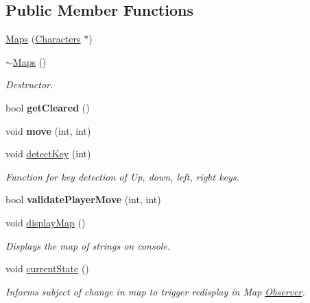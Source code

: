 \subsection*{Public Member Functions}
\begin{DoxyCompactItemize}
\item 
\hyperlink{class_maps_a7396b48b15d3044eaba86e0d6c6bce11}{Maps} (\hyperlink{class_characters}{Characters} $\ast$)
\item 
\hypertarget{class_maps_aa3fbced631bfb5f4d1fe541a8a29384f}{}\label{class_maps_aa3fbced631bfb5f4d1fe541a8a29384f} 
\hyperlink{class_maps_aa3fbced631bfb5f4d1fe541a8a29384f}{$\sim$\+Maps} ()
\begin{DoxyCompactList}\small\item\em Destructor. \end{DoxyCompactList}\item 
\hypertarget{class_maps_a1916437763c9bd725260cf0b642d3d7f}{}\label{class_maps_a1916437763c9bd725260cf0b642d3d7f} 
bool {\bfseries get\+Cleared} ()
\item 
\hypertarget{class_maps_af218b48fb82dc507011a6c3790917774}{}\label{class_maps_af218b48fb82dc507011a6c3790917774} 
void {\bfseries move} (int, int)
\item 
\hypertarget{class_maps_a3cd4fbec4b22b8008860a6c17b4606cb}{}\label{class_maps_a3cd4fbec4b22b8008860a6c17b4606cb} 
void \hyperlink{class_maps_a3cd4fbec4b22b8008860a6c17b4606cb}{detect\+Key} (int)
\begin{DoxyCompactList}\small\item\em Function for key detection of Up, down, left, right keys. \end{DoxyCompactList}\item 
\hypertarget{class_maps_a604a2f2297bb19fcc76ff0d9602fc342}{}\label{class_maps_a604a2f2297bb19fcc76ff0d9602fc342} 
bool {\bfseries validate\+Player\+Move} (int, int)
\item 
\hypertarget{class_maps_a05cfcf1cf32247e6554518c6a49fb9c3}{}\label{class_maps_a05cfcf1cf32247e6554518c6a49fb9c3} 
void \hyperlink{class_maps_a05cfcf1cf32247e6554518c6a49fb9c3}{display\+Map} ()
\begin{DoxyCompactList}\small\item\em Displays the map of strings on console. \end{DoxyCompactList}\item 
\hypertarget{class_maps_af06bd8a4c70f79ae393a3ca22c53e07f}{}\label{class_maps_af06bd8a4c70f79ae393a3ca22c53e07f} 
void \hyperlink{class_maps_af06bd8a4c70f79ae393a3ca22c53e07f}{current\+State} ()
\begin{DoxyCompactList}\small\item\em Informs subject of change in map to trigger redisplay in Map \hyperlink{class_observer}{Observer}. \end{DoxyCompactList}\end{DoxyCompactItemize}


